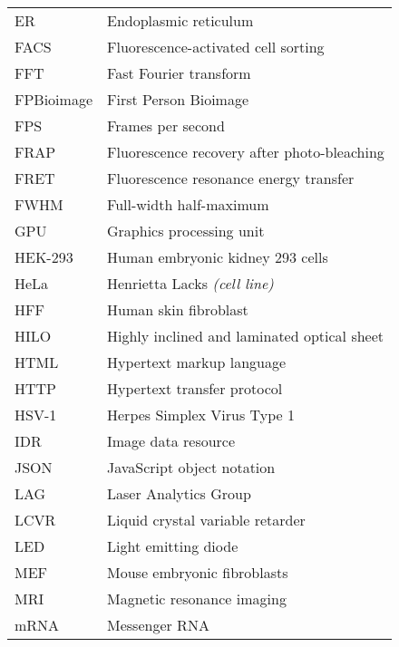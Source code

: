 \begin{flushleft}
\begin{longtable}[l]{|p{5.5em}|p{25em}|}
ER         & Endoplasmic reticulum                                      \\
FACS       & Fluorescence-activated cell sorting                        \\
FFT		   & Fast Fourier transform										\\
FPBioimage & First Person Bioimage                                      \\
FPS        & Frames per second                                          \\
FRAP       & Fluorescence recovery after photo-bleaching                \\
FRET  	   & Fluorescence resonance energy transfer					    \\
FWHM       & Full-width half-maximum                                    \\
GPU        & Graphics processing unit                                   \\
HEK-293    & Human embryonic kidney 293 cells                           \\
HeLa       & Henrietta Lacks \textit{(cell line)}                       \\
HFF        & Human skin fibroblast                                      \\
HILO	   & Highly inclined and laminated optical sheet				\\
HTML       & Hypertext markup language                                  \\
HTTP       & Hypertext transfer protocol                                \\
HSV-1	   & Herpes Simplex Virus Type 1								\\
IDR        & Image data resource                                        \\
JSON       & JavaScript object notation                                 \\
LAG        & Laser Analytics Group                                      \\
LCVR       & Liquid crystal variable retarder                           \\
LED        & Light emitting diode                                       \\
MEF        & Mouse embryonic fibroblasts                                \\
MRI        & Magnetic resonance imaging                                 \\
mRNA       & Messenger RNA                                              \\

\end{longtable}
\end{flushleft}
